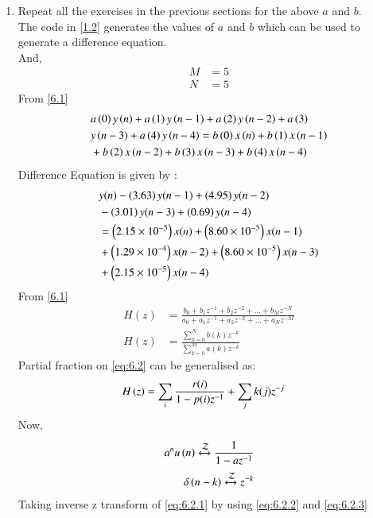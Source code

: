 \documentclass[journal,12pt,twocolumn]{IEEEtran}
\newcommand{\systemZ}[1]{\stackrel{#1}{\mathcal{Z}}}
\theoremstyle{remark}
\begin{document}
\begin{enumerate}[label=\thesection.\arabic*]
\item Repeat all the exercises in the previous sections for the above $a$ and $b$.\\
\solution The code in \ref{1.2} generates the values of $a$ and $b$  which can be used to generate a difference equation.\\
And,
\begin{align}
    M &= 5\\
    N&=5
\end{align}
From \ref{6.1} 
\begin{align}
    &a\left(0\right)y\left(n\right) + a\left(1\right)y\left(n-1\right)+a\left(2\right)y\left(n-2\right)+a\left(3\right)\\ \notag &y\left(n-3\right) + a\left(4\right)y\left(n-4\right) =   b\left(0\right)x\left(n\right) + b\left(1\right)x\left(n-1\right)\\ \notag &+b\left(2\right)x\left(n-2\right)+b\left(3\right)x\left(n-3\right) + b\left(4\right)x\left(n-4\right) 
\end{align}
Difference Equation is given by :
\begin{align}
	&y(n) - \left(3.63\right)y(n - 1) + \left(4.95\right)y(n - 2) \nonumber \\
	&- \left(3.01\right)y(n - 3) + \left(0.69\right)y(n - 4) \nonumber \\
	&= \left(2.15\times 10^{-5}\right)x(n) + \left(8.60 \times 10^{-5}\right)x(n - 1) \nonumber \\
	&+ \left(1.29 \times 10^{-4}\right)x(n - 2) + \left(8.60 \times 10^{-5}\right)x(n - 3) \nonumber \\
	&+ \left(2.15\times 10^{-5}\right)x(n - 4)
\end{align}
From \eqref{6.1} 
\begin{align}
    H(z) &= \frac{b_0 + b_1 z^{-1} + b_2 z^{-2} + \ldots + b_M z^{-N}}{a_0 + a_1 z^{-1} + a_2 z^{-2} + \ldots + a_N z^{-M}}\\
    H(z) &= \frac{\sum_{k = 0}^{N}b(k)z^{-k}}{\sum_{k = 0}^{M}a(k)z^{-k}} \label{eq:6.2}
\end{align}
Partial fraction on \eqref{eq:6.2} can be generalised as:
\begin{align}
    H\left(z\right)&= \sum_{i}\frac{r(i)}{1 - p(i)z^{-1}} + \sum_{j}k(j)z^{-j}
	\label{eq:6.2.1}
\end{align}
Now,
\begin{align}
    a^{n}u\brak{n} \xleftrightarrow{\systemZ{}}  \frac{1}{1-az^{-1}} \label{eq:6.2.2}\\
    \delta\brak{n-k} \xleftrightarrow{\systemZ{}} z^{-k}\label{eq:6.2.3}
\end{align}
Taking inverse z transform of \eqref{eq:6.2.1} by using \eqref{eq:6.2.2} and \eqref{eq:6.2.3}

\end{enumerate}
\end{document}
